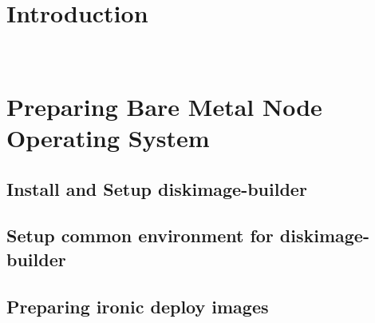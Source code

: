 \documentclass[letterpaper]{article}
\begin{document}
\graphicspath{{common/figures/}}
\thispagestyle{empty}


 

\newpage
\tableofcontents
\newpage


\section{Introduction} \label{sec:introduction}

 \\








\clearpage
\section{Preparing Bare Metal Node Operating System}\label{sec:baremetalprep}


\subsection{Install and Setup diskimage-builder}\label{sec:dib_install}


\subsection{Setup common environment for diskimage-builder}\label{sec:dib_environment}


\subsection{Preparing ironic deploy images}\label{sec:ironic_deploy_images}

\end{document}
